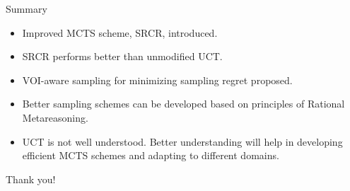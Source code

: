 \documentclass{beamer}
\begin{document}
\begin{frame}{Summary}
\begin{itemize}
\item<+-> Improved MCTS scheme, SRCR, introduced.
\item<+-> SRCR performs better than unmodified UCT.
\item<+-> VOI-aware sampling for minimizing sampling regret proposed.
\item<+-> Better sampling schemes can be developed based on principles
  of Rational Metareasoning.
\item<+-> UCT is not well understood. Better understanding will help
  in developing efficient  MCTS schemes and adapting to different domains.
\end{itemize}
\end{frame}

\begin{frame}{}
\begin{center}
\LARGE{Thank you!}
\end{center}
\end{frame}
\end{document}
